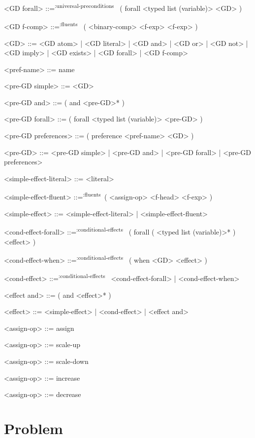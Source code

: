 \documentclass[]{article}
\newcommand{\fluents}{\textsuperscript{:fluents}~}
\newcommand{\universalpreconditions}{\textsuperscript{:universal-preconditions}~}
\newcommand{\conditionaleffects}{\textsuperscript{:conditional-effects}~}
\begin{document}
\begin{grammar}
    <GD forall> ::=\universalpreconditions{} ( forall <typed list (variable)> <GD> )

    <GD f-comp> ::=\fluents{} ( <binary-comp> <f-exp> <f-exp> )

    <GD> ::= <GD atom> | <GD literal> | <GD and> | <GD or> | <GD not> | <GD imply> | <GD exists> | <GD forall> | <GD f-comp>

    <pref-name> ::= name

    <pre-GD simple> ::= <GD>

    <pre-GD and> ::= ( and <pre-GD>* )

    <pre-GD forall> ::= ( forall <typed list (variable)> <pre-GD> )

    <pre-GD preferences> ::= ( preference <pref-name> <GD> )

    <pre-GD> ::= <pre-GD simple> | <pre-GD and> | <pre-GD forall> | <pre-GD preferences>


    <simple-effect-literal> ::= <literal>

    <simple-effect-fluent> ::=\fluents ( <assign-op> <f-head> <f-exp> )

    <simple-effect> ::= <simple-effect-literal> | <simple-effect-fluent>

    <cond-effect-forall> ::=\conditionaleffects{} ( forall ( <typed list (variable)>* ) <effect> )

    <cond-effect-when> ::=\conditionaleffects{} ( when <GD> <effect> )

    <cond-effect> ::=\conditionaleffects{} <cond-effect-forall> | <cond-effect-when>

    <effect and> ::= ( and <effect>* )

    <effect> ::= <simple-effect> | <cond-effect> | <effect and>


    <assign-op> ::= assign

    <assign-op> ::= scale-up

    <assign-op> ::= scale-down

    <assign-op> ::= increase

    <assign-op> ::= decrease
\end{grammar}

\section{Problem}
\end{document}
